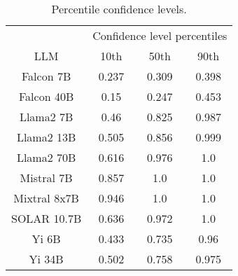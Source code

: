 \begin{table*}
\centering
\begin{tabular}{c|c|c|c}
& \multicolumn{3}{c}{Confidence level percentiles} \\ 
LLM & 10th & 50th & 90th\\ \hline
Falcon 7B & 0.237 & 0.309 & 0.398\\
Falcon 40B & 0.15 & 0.247 & 0.453\\
Llama2 7B & 0.46 & 0.825 & 0.987\\
Llama2 13B & 0.505 & 0.856 & 0.999\\
Llama2 70B & 0.616 & 0.976 & 1.0\\
Mistral 7B & 0.857 & 1.0 & 1.0\\
Mixtral 8x7B & 0.946 & 1.0 & 1.0\\
SOLAR 10.7B & 0.636 & 0.972 & 1.0\\
Yi 6B & 0.433 & 0.735 & 0.96\\
Yi 34B & 0.502 & 0.758 & 0.975\\
\hline
\end{tabular}
\caption{Percentile confidence levels.}
\label{tab:percentile_conf}
\end{table*}
